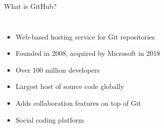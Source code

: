 \documentclass[aspectratio=169]{beamer}
\begin{document}
	\begin{frame}{What is GitHub?}
		\begin{columns}
			\begin{itemize}
				\item Web-based hosting service for Git repositories
				\item Founded in 2008, acquired by Microsoft in 2018
				\item Over 100 million developers
				\item Largest host of source code globally
				\item Adds collaboration features on top of Git
				\item Social coding platform
			\end{itemize}
			
			\begin{center}
			\end{center}
		\end{columns}
	\end{frame}
	
\end{document}
